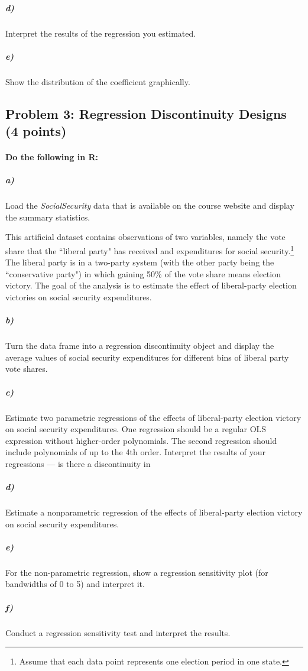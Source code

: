 \documentclass[12pt]{article}
\begin{document}
\subparagraph{d)} Interpret the results of the regression you estimated.

\subparagraph{e)} Show the distribution of the coefficient graphically.



\subsection*{Problem 3: Regression Discontinuity Designs (4 points)}

\paragraph{Do the following in R:}

\subparagraph{a)} Load the \textit{SocialSecurity} data that is available on the course website and display the summary statistics.

This artificial dataset contains observations of two variables, namely the vote share that the ``liberal party" has received and expenditures for social security.\footnote{Assume that each data point represents one election period in one state.} The liberal party is in a two-party system (with the other party being the ``conservative party") in which gaining 50\% of the vote share means election victory. The goal of the analysis is to estimate the effect of liberal-party election victories on social security expenditures.

\subparagraph{b)} Turn the data frame into a regression discontinuity object and display the average values of social security expenditures for different bins of liberal party vote shares.

\subparagraph{c)} Estimate two parametric regressions of the effects of liberal-party election victory on social security expenditures. One regression should be a regular OLS expression without higher-order polynomials. The second regression should include polynomials of up to the 4th order. Interpret the results of your regressions --- is there a discontinuity in 

\subparagraph{d)} Estimate a nonparametric regression of the effects of liberal-party election victory on social security expenditures.

\subparagraph{e)} For the non-parametric regression, show a regression sensitivity plot (for bandwidths of 0 to 5) and interpret it.

\subparagraph{f)} Conduct a regression sensitivity test and interpret the results.
\end{document}
